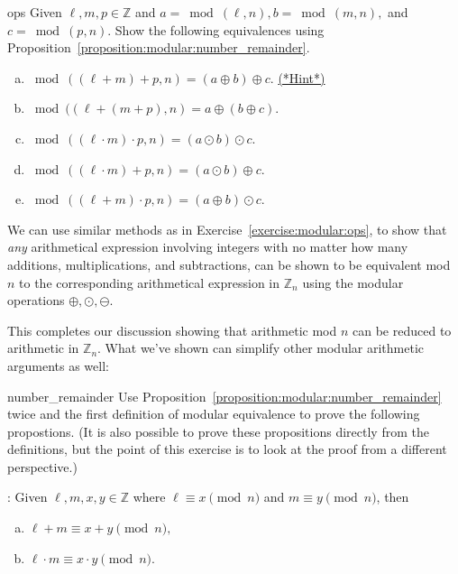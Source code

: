 \begin{exercise}{ops}
Given $\ell,m,p \in {\mathbb Z}$ and $a=\bmod(\ell,n), b=\bmod(m,n),$ and $c=\bmod(p,n)$.  Show the  following equivalences using Proposition~\ref{proposition:modular:number_remainder}.
\begin{enumerate}[(a)]
\item
$\bmod( (\ell +m) + p,n) = (a \oplus b) \oplus c$.\qquad
\hyperref[sec:modular_arithmetic:hints]{(*Hint*)}
\item
$\bmod( (\ell + (m + p),n) = a \oplus (b \oplus c)$.
\item
$\bmod( (\ell \cdot m) \cdot p,n) = (a \odot b) \odot c .$
\item
$ \bmod((\ell \cdot m) + p,n) = (a \odot b) \oplus c . $
\item
$ \bmod((\ell + m) \cdot p,n) = (a \oplus b) \odot c. $
\end{enumerate}
\end{exercise}

We can use similar methods as in Exercise~\ref{exercise:modular:ops}, to show that \emph{any} arithmetical expression involving integers with no matter how many additions, multiplications, and subtractions, can be shown to be equivalent mod $n$ to the corresponding arithmetical expression in ${\mathbb Z}_n$ using the modular operations $\oplus, \odot, \ominus$.

This completes our discussion showing that arithmetic mod $n$ can be reduced to arithmetic in ${\mathbb Z}_n$.  What we've shown can simplify other modular arithmetic arguments as well:

\begin{exercise}{number_remainder}
Use  Proposition~\ref{proposition:modular:number_remainder} twice and the first definition of modular equivalence to prove the following propostions.  (It is also possible to prove these propositions directly from the definitions, 
but the point of this exercise is to look at the proof from a different perspective.)

: Given $\ell,m,x,y \in {\mathbb Z}$ where $\ell \equiv x \pmod{n}$ and $m \equiv y \pmod{n}$, then 

\begin{enumerate}[(a)]
\item
$\ell + m \equiv x + y \pmod{n},$ 
\item
$\ell \cdot m \equiv x \cdot y \pmod{n}$.
\end{enumerate}
\end{exercise}

